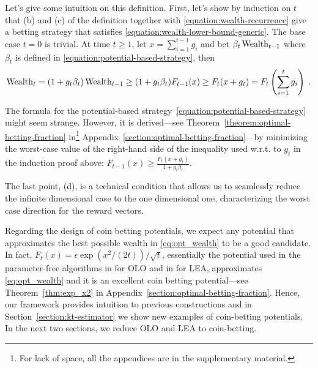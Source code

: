 Let's give some intuition on this definition.  First, let's show by induction
on $t$ that (b) and (c) of the definition together with
\eqref{equation:wealth-recurrence} give a betting strategy that satisfies
\eqref{equation:wealth-lower-bound-generic}. The base case $t=0$ is trivial. At
time $t \ge 1$, let $x = \sum_{i=1}^{t-1} g_i$ and bet $\beta_t \operatorname{Wealth}_{t-1}$
where $\beta_t$ is defined in \eqref{equation:potential-based-strategy}, then
\vspace{-.2cm}
\[
\operatorname{Wealth}_t
= (1+g_t \beta_t) \operatorname{Wealth}_{t-1}
\ge (1 + g_t \beta_t) F_{t-1}(x)
\ge F_t(x + g_t)
= F_t \left( \sum_{i=1}^t g_i \right) \; .
\]

The formula for the potential-based
strategy~\eqref{equation:potential-based-strategy} might seem strange. However,
it is derived---see Theorem~\ref{theorem:optimal-betting-fraction} in\footnote{For lack of space, all the appendices are in the supplementary material.}
Appendix~\ref{section:optimal-betting-fraction}---by minimizing the worst-case
value of the right-hand side of the inequality used w.r.t. to $g_t$ in the
induction proof above: $F_{t-1}(x) \ge \tfrac{F_{t}(x + g_t)}{1+g_t\beta_t}$.

The last point, (d), is a technical condition that allows us to
seamlessly reduce the infinite dimensional case to the one dimensional one, characterizing the worst case direction for the reward vectors.

Regarding the design of coin betting potentials, we expect any potential that approximates the best possible wealth in \eqref{eq:opt_wealth} to be a good candidate.
In fact, $F_t(x)=\epsilon
\exp \left(x^2/(2t)\right)/\sqrt{t}$, essentially the potential used in
the parameter-free algorithms in \cite{McMahan-Orabona-2014, Orabona-2014} for
\ac{OLO} and in \cite{Chaudhuri-Freund-Hsu-2009, Luo-Schapire-2014,
Luo-Schapire-2015} for \ac{LEA}, approximates \eqref{eq:opt_wealth} and it is an excellent coin betting potential---see Theorem~\ref{thm:exp_x2} in Appendix~\ref{section:optimal-betting-fraction}. Hence, our framework provides intuition to previous constructions and in Section~\ref{section:kt-estimator} we show new examples of coin-betting potentials. In the next two sections, we reduce \ac{OLO} and \ac{LEA} to coin-betting.
